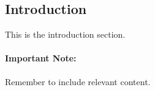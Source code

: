 \subsection{Introduction}

This is the introduction section.

\paragraph{Important Note:} Remember to include relevant content.
